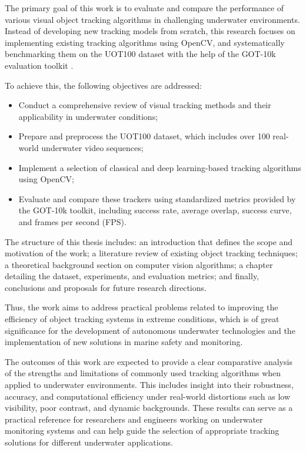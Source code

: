 The primary goal of this work is to evaluate and compare the performance of various visual object tracking algorithms in challenging underwater environments. Instead of developing new tracking models from scratch, this research focuses on implementing existing tracking algorithms using OpenCV, and systematically benchmarking them on the UOT100 dataset \cite{kezebou2019underwater} with the help of the GOT-10k evaluation toolkit \cite{huang2019got}.

To achieve this, the following objectives are addressed:

\begin{itemize}
    \item Conduct a comprehensive review of visual tracking methods and their applicability in underwater conditions;
    \item Prepare and preprocess the UOT100 dataset, which includes over 100 real-world underwater video sequences;
    \item Implement a selection of classical and deep learning-based tracking algorithms using OpenCV;
    \item Evaluate and compare these trackers using standardized metrics provided by the GOT-10k toolkit, including success rate, average overlap, success curve, and frames per second (FPS).
\end{itemize}


The structure of this thesis includes: an introduction that defines the scope and motivation of the work; a literature review of existing object tracking techniques; a theoretical background section on computer vision algorithms; a chapter detailing the dataset, experiments, and evaluation metrics; and finally, conclusions and proposals for future research directions. 


Thus, the work aims to address practical problems related to improving the efficiency of object tracking systems in extreme conditions, which is of great significance for the development of autonomous underwater technologies and the implementation of new solutions in marine safety and monitoring.

The outcomes of this work are expected to provide a clear comparative analysis of the strengths and limitations of commonly used tracking algorithms when applied to underwater environments. This includes insight into their robustness, accuracy, and computational efficiency under real-world distortions such as low visibility, poor contrast, and dynamic backgrounds. These results can serve as a practical reference for researchers and engineers working on underwater monitoring systems and can help guide the selection of appropriate tracking solutions for different underwater applications.


\endinput